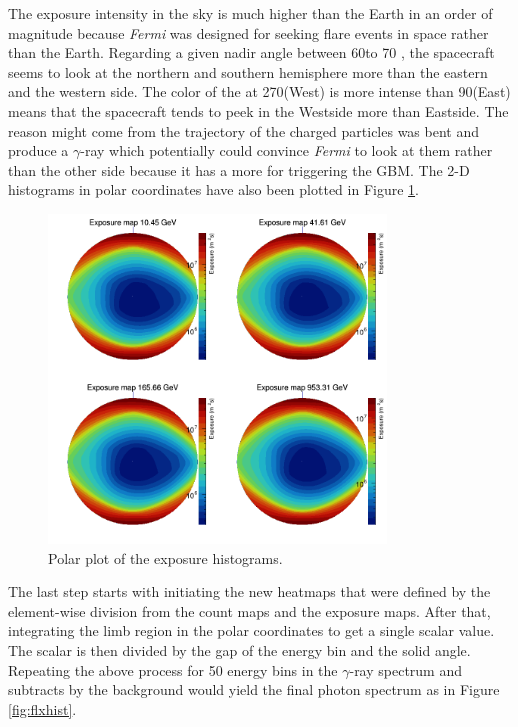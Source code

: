 The exposure intensity in the sky is much
higher than the Earth in an order of magnitude
because \textit{Fermi} was designed
for seeking flare events in space rather than the Earth.
Regarding a given nadir angle between
60\textdegree to 70 \textdegree,
the spacecraft seems to look at the northern and southern hemisphere 
more than the eastern and the western side. The color of the 
at 270\textdegree (West) is more intense than 90\textdegree (East)
means that the spacecraft tends to peek in the Westside more
than Eastside. The reason might come from the
trajectory of the charged particles was bent
and produce a $\gamma$-ray which potentially could 
convince \textit{Fermi} to look at them rather
than the other side because it 
has a more for triggering the GBM.
The 2-D histograms in polar coordinates have also been
plotted in Figure \ref{fig:expmap_polar}.

\begin{figure}[h!]
    \centering
    \includegraphics[width=0.8\textwidth]{content/result_and_discussion/figures/polar_expmaps.png}
    \caption{Polar plot of the exposure histograms.}
    \label{fig:expmap_polar}
\end{figure}


The last step starts with initiating the new heatmaps that were 
defined by the element-wise division from the
count maps and the exposure maps.
After that, integrating the limb region in the polar coordinates
to get a single scalar value. The scalar is then divided by the 
gap of the energy bin and the solid angle.
Repeating the above process for 50 energy bins in the $\gamma$-ray 
spectrum and subtracts by the background would yield the final 
photon spectrum as in Figure \ref{fig:flxhist}.


